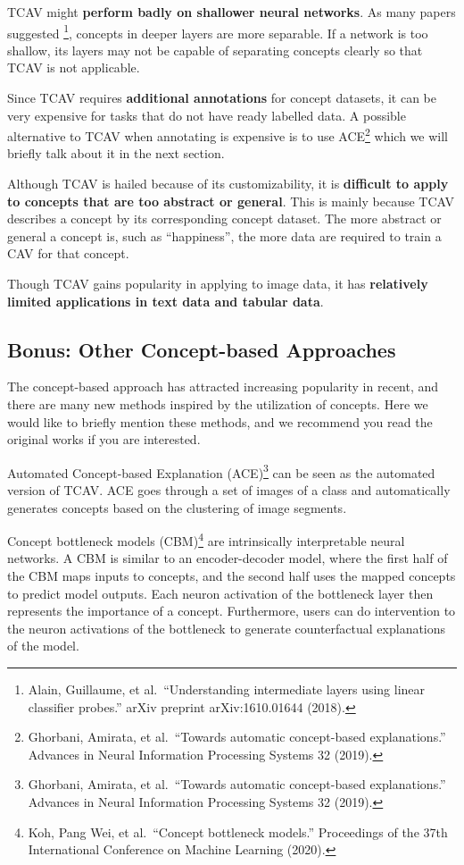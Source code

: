 \documentclass[
  12pt,
]{krantz}
\begin{document}
TCAV might \textbf{perform badly on shallower neural networks}.
As many papers suggested \footnote{Alain, Guillaume, et al.~``Understanding intermediate layers using linear classifier probes.'' arXiv preprint arXiv:1610.01644 (2018).}, concepts in deeper layers are more separable.
If a network is too shallow, its layers may not be capable of separating concepts clearly so that TCAV is not applicable.

Since TCAV requires \textbf{additional annotations} for concept datasets, it can be very expensive for tasks that do not have ready labelled data.
A possible alternative to TCAV when annotating is expensive is to use ACE\footnote{Ghorbani, Amirata, et al.~``Towards automatic concept-based explanations.'' Advances in Neural Information Processing Systems 32 (2019).} which we will briefly talk about it in the next section.

Although TCAV is hailed because of its customizability, it is \textbf{difficult to apply to concepts that are too abstract or general}.
This is mainly because TCAV describes a concept by its corresponding concept dataset.
The more abstract or general a concept is, such as ``happiness'', the more data are required to train a CAV for that concept.

Though TCAV gains popularity in applying to image data, it has \textbf{relatively limited applications in text data and tabular data}.

\hypertarget{bonus-other-concept-based-approaches}{%
\subsection{Bonus: Other Concept-based Approaches}\label{bonus-other-concept-based-approaches}}

The concept-based approach has attracted increasing popularity in recent, and there are many new methods inspired by the utilization of concepts. Here we would like to briefly mention these methods, and we recommend you read the original works if you are interested.

Automated Concept-based Explanation (ACE)\footnote{Ghorbani, Amirata, et al.~``Towards automatic concept-based explanations.'' Advances in Neural Information Processing Systems 32 (2019).} can be seen as the automated version of TCAV.
ACE goes through a set of images of a class and automatically generates concepts based on the clustering of image segments.

Concept bottleneck models (CBM)\footnote{Koh, Pang Wei, et al.~``Concept bottleneck models.'' Proceedings of the 37th International Conference on Machine Learning (2020).} are intrinsically interpretable neural networks.
A CBM is similar to an encoder-decoder model, where the first half of the CBM maps inputs to concepts, and the second half uses the mapped concepts to predict model outputs.
Each neuron activation of the bottleneck layer then represents the importance of a concept.
Furthermore, users can do intervention to the neuron activations of the bottleneck to generate counterfactual explanations of the model.
\end{document}
